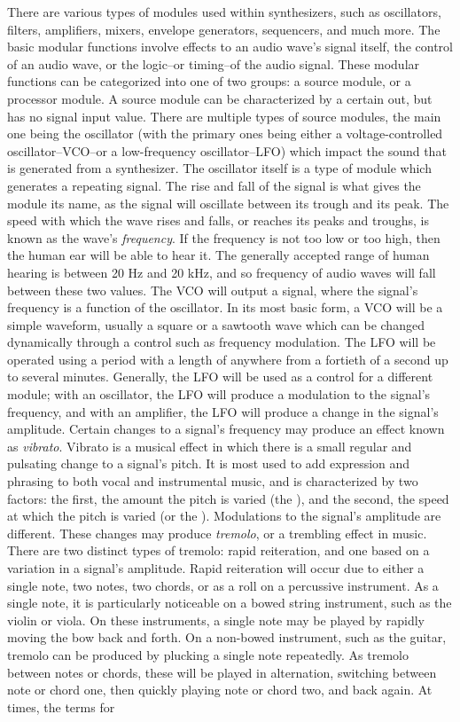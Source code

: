 There are various types of modules used within synthesizers, such as oscillators, filters, amplifiers, mixers, envelope generators, sequencers, and much more. The basic modular functions involve effects to an audio wave's signal itself, the control of an audio wave, or the logic--or timing--of the audio signal\cite{Gabrielli_2020}. These modular functions can be categorized into one of two groups: a source module, or a processor module. A source module can be characterized by a certain out, but has no signal input value. There are multiple types of source modules, the main one being the oscillator (with the primary ones being either a voltage-controlled oscillator--VCO--or a low-frequency oscillator--LFO) which impact the sound that is generated from a synthesizer. The oscillator itself is a type of module which generates a repeating signal\cite{Gabrielli_2020}. The rise and fall of the signal is what gives the module its name, as the signal will oscillate between its trough and its peak\cite{Rosen_Howell_2011}. The speed with which the wave rises and falls, or reaches its peaks and troughs, is known as the wave's \textit{frequency}. If the frequency is not too low or too high, then the human ear will be able to hear it. The generally accepted range of human hearing is between 20 Hz and 20 kHz, and so frequency of audio waves will fall between these two values. The VCO will output a signal, where the signal's frequency is a function of the oscillator. In its most basic form, a VCO will be a simple waveform, usually a square or a sawtooth wave which can be changed dynamically through a control such as frequency modulation. The LFO will be operated using a period with a length of anywhere from a fortieth of a second up to several minutes. Generally, the LFO will be used as a control for a different module; with an oscillator, the LFO will produce a modulation to the signal's frequency, and with an amplifier, the LFO will produce a change in the signal's amplitude. Certain changes to a signal's frequency may produce an effect known as \textit{vibrato}. Vibrato is a musical effect in which there is a small regular and pulsating change to a signal's pitch. It is most used to add expression and phrasing to both vocal and instrumental music, and is characterized by two factors: the first, the amount the pitch is varied (the ), and the second, the speed at which the pitch is varied (or the ). Modulations to the signal's amplitude are different. These changes may produce \textit{tremolo}, or a trembling effect in music. There are two distinct types of tremolo: rapid reiteration, and one based on a variation in a signal's amplitude. Rapid reiteration will occur due to either a single note, two notes, two chords, or as a roll on a percussive instrument. As a single note, it is particularly noticeable on a bowed string instrument, such as the violin or viola. On these instruments, a single note may be played by rapidly moving the bow back and forth. On a non-bowed instrument, such as the guitar, tremolo can be produced by plucking a single note repeatedly. As tremolo between notes or chords, these will be played in alternation, switching between note or chord one, then quickly playing note or chord two, and back again. At times, the terms for 